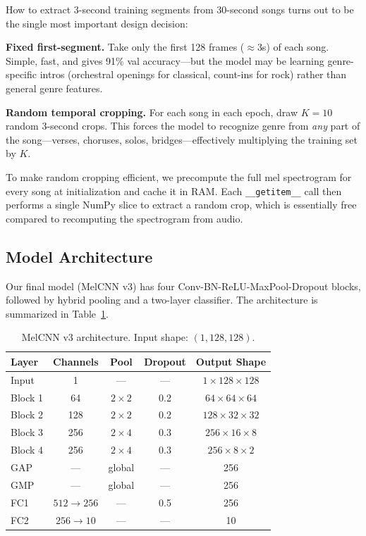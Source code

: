 How to extract 3-second training segments from 30-second songs turns out to be the single most important design decision:

\textbf{Fixed first-segment.} Take only the first 128 frames ($\approx$3s) of each song. Simple, fast, and gives 91\% val accuracy---but the model may be learning genre-specific intros (orchestral openings for classical, count-ins for rock) rather than general genre features.

\textbf{Random temporal cropping.} For each song in each epoch, draw $K=10$ random 3-second crops. This forces the model to recognize genre from \emph{any} part of the song---verses, choruses, solos, bridges---effectively multiplying the training set by $K$.

To make random cropping efficient, we precompute the full mel spectrogram for every song at initialization and cache it in RAM. Each \texttt{\_\_getitem\_\_} call then performs a single NumPy slice to extract a random crop, which is essentially free compared to recomputing the spectrogram from audio.

\subsection{Model Architecture}
\label{sec:architecture}

Our final model (MelCNN v3) has four Conv-BN-ReLU-MaxPool-Dropout blocks, followed by hybrid pooling and a two-layer classifier. The architecture is summarized in Table~\ref{tab:architecture}.

\begin{table}[h]
\centering
\caption{MelCNN v3 architecture. Input shape: $(1, 128, 128)$.}
\label{tab:architecture}
\begin{tabular}{@{}lcccc@{}}
\toprule
Layer & Channels & Pool & Dropout & Output Shape \\
\midrule
Input & 1 & --- & --- & $1 \times 128 \times 128$ \\
Block 1 & 64 & $2 \times 2$ & 0.2 & $64 \times 64 \times 64$ \\
Block 2 & 128 & $2 \times 2$ & 0.2 & $128 \times 32 \times 32$ \\
Block 3 & 256 & $2 \times 4$ & 0.3 & $256 \times 16 \times 8$ \\
Block 4 & 256 & $2 \times 4$ & 0.3 & $256 \times 8 \times 2$ \\
\midrule
GAP & --- & global & --- & 256 \\
GMP & --- & global & --- & 256 \\
\midrule
FC1 & $512 \to 256$ & --- & 0.5 & 256 \\
FC2 & $256 \to 10$ & --- & --- & 10 \\
\bottomrule
\end{tabular}
\end{table}


